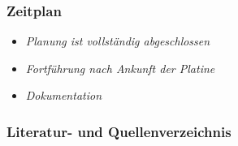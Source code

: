 \documentclass{beamer}
\begin{document}
\begin{frame}
  \frametitle{Zeitplan}
  \begin{itemize}
  \item \emph{Planung ist vollständig abgeschlossen}
  \item \emph{Fortführung nach Ankunft der Platine}
  \item \emph{Dokumentation} %
  \end{itemize}
\end{frame}
\begin{frame}[allowframebreaks]
  \frametitle{Literatur- und Quellenverzeichnis}
   
\end{frame}

\end{document}
